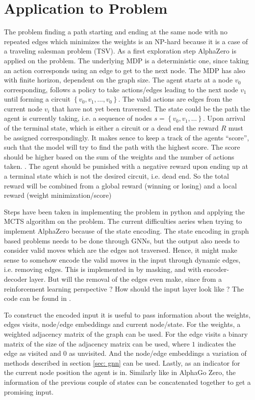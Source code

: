 \section{Application to Problem}
The problem finding a path starting and ending at the same node with no
repeated edges which minimizes the weights is an NP-hard because it is a case
of a traveling salesman problem (TSV). As a first exploration step AlphaZero
is applied on the problem. The underlying MDP is a deterministic one, since
taking an action corresponds using an edge to get to the next node. The MDP
has also with finite horizon, dependent on the graph size. The agent starts
at a node $v_0$ corresponding, follows a policy to take actions/edges leading
to the next node $v_1$ until forming a circuit $\left\{ v_0, v_1, \ldots, v_0
\right\}$. The valid actions are edges from the current node $v_i$ that have
not yet been traversed. The state could be the path the agent is currently
taking, i.e. a sequence of nodes $s = \left\{ v_0,v_1,\ldots \right\}$. Upon
arrival of the terminal state, which is either a circuit or a dead end the
reward $R$ must be assigned correspondingly. It makes sence to keep a track
of the agents "`score"', such that the model will try to find the path with the
highest score. The score should be higher based on the sum of the weights and
the number of actions taken. . The agent should be punished with a negative
reward upon ending up at a terminal state which is not the desired circuit,
i.e. dead end. So the total reward will be combined from a global reward
(winning or losing) and a local reward (weight minimization/score)
\newline

Steps have been taken in implementing the problem in python and applying the
MCTS algorithm on the problem. The current difficulties aeries when trying to
implement AlphaZero because of the state encoding. The state encoding in
graph based problems needs to be done through GNNs, but the output also needs
to consider valid moves which are the edges not traversed. Hence, it might
make sense to somehow encode the valid moves in the input through dynamic
edges, i.e. removing edges. This is implemented in \cite{rl_coopt} by
masking, and with encoder-decoder layer. But will the removal of the edges
even make, since from a reinforcement learning perspective ? How should the
input layer look like ? The code can be found in \cite{github}.
\newline

To construct the encoded input it is useful to pass information about the
weights, edges visits, node/edge embeddings and current node/state. For the
weights, a weighted adjacency matrix of the graph can be used. For the edge
visits a binary matrix of the size of the adjacency matrix can be used, where
$1$ indicates the edge as visited and $0$ as unvisited. And the node/edge
embeddings a variation of methods described in section \ref{sec: gnn} can be
used. Lastly, as an indicator for the current node position the agent is in.
Similarly like in AlphaGo Zero, the information of the previous couple of
states can be concatenated together to get a promising input.

